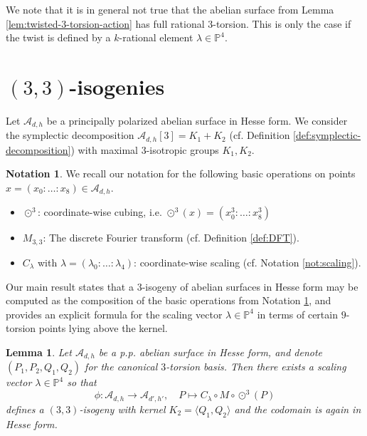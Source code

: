 \documentclass[11pt]{amsart}
\newtheorem{lemma}[theorem]{Lemma}
\theoremstyle{definition}
\newtheorem{notation}[theorem]{Notation}
\newcommand{\A}{\mathcal{A}}
\newcommand{\PP}{\mathbb{P}}
\newcommand{\cube}{\odot^3}
\begin{document}
We note that it is in general not true that the abelian surface from Lemma \ref{lem:twisted-3-torsion-action} has full rational $3$-torsion. This is only the case if the twist is defined by a $k$-rational element $\lambda \in \PP^4$. 

\section{$(3,3)$-isogenies} \label{sec:isogeny}


Let $\A_{d,h}$ be a principally polarized abelian surface in Hesse form. We consider the symplectic decomposition $\A_{d,h}[3] = K_1 + K_2$ (cf. Definition \ref{def:symplectic-decomposition}) with maximal $3$-isotropic groups $K_1,K_2$.  

\begin{notation} \label{not:basic-operations}
    We recall our notation for the following basic operations on points $x = (x_0: \dots : x_8) \in \A_{d,h}$.
    \begin{itemize}
    \item $\cube$:  coordinate-wise cubing, i.e. $\cube(x) = (x_0^3 : \dots : x_8^3)$
    \item $M_{3,3}$: The discrete Fourier transform (cf. Definition \ref{def:DFT}).
    \item $C_{\lambda}$ with $\lambda = (\lambda_0: \dots : \lambda_4)$: coordinate-wise scaling (cf. Notation \ref{not:scaling}).
    \end{itemize}
\end{notation}

Our main result states that a $3$-isogeny of abelian surfaces in Hesse form may be computed as the composition of the basic operations from Notation \ref{not:basic-operations}, and provides an explicit formula for the scaling vector $\lambda \in \PP^4$ in terms of certain $9$-torsion points lying above the kernel. 


\begin{lemma} \label{lem:3-isogeny-form}
	Let $\A_{d,h}$ be a p.p. abelian surface in Hesse form, and denote $(P_1,P_2,Q_1,Q_2)$ for the canonical $3$-torsion basis.
	Then there exists a scaling vector $\lambda \in \PP^4$ so that
	\[
	\phi: \A_{d,h} \to \A_{d',h'}, \quad P \mapsto C_\lambda \circ M \circ \cube(P)
	\]
	defines a $(3,3)$-isogeny with kernel $K_2 = \langle Q_1, Q_2\rangle$ and the codomain is again in Hesse form. 
\end{lemma}
\end{document}
